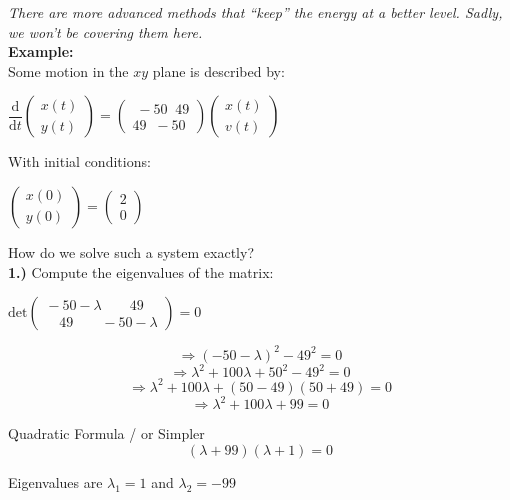 \documentclass[a4paper,12pt]{report}
\begin{document}
	\noindent \textit{There are more advanced methods that ``keep'' the energy at a better level.  Sadly, we won't be covering them here.}\\
	
	\noindent \textbf{Example:}\\
	Some motion in the $xy$ plane is described by:
	\begin{center}
		$\dfrac{\mathrm{d}}{\mathrm{d}t}
  		\begin{pmatrix}
			x(t)\\
			y(t)
		\end{pmatrix}
			=
		\begin{pmatrix}
			\;-50 \; \; 49 \\
			49 \; \;-50
			\end{pmatrix}
		\begin{pmatrix}
			x(t) \\
			v(t)
		\end{pmatrix}
		$
	\end{center}
	With initial conditions:
	\begin{center}
	$
		\begin{pmatrix}
			x(0)\\
			y(0)
		\end{pmatrix}
			=
		\begin{pmatrix}
			2 \\
			0
		\end{pmatrix}
		$
	\end{center}
	
	
	\noindent How do we solve such a system exactly?\\
	
	\noindent \textbf{1.)} Compute the eigenvalues of the matrix:\\
	\begin{center}
	$\text{det}
	\begin{pmatrix}
		\! \! -50 - \lambda \qquad 49 \\
		\quad 49 \qquad -50 - \lambda
	\end{pmatrix}
	= 0
	$
	\end{center}
	$$\Rightarrow (-50 - \lambda)^2 - 49^2 = 0 $$
	$$\Rightarrow \lambda ^2 + 100 \lambda + 50^2 - 49^2 = 0 $$
	$$\Rightarrow \lambda ^ 2 + 100 \lambda + (50-49)(50+49) = 0 $$
	$$\Rightarrow \lambda ^2 + 100 \lambda + 99  = 0$$
	
	\noindent Quadratic Formula / or Simpler
	$$ (\lambda + 99)(\lambda +1) = 0 $$
	
	\noindent Eigenvalues are $\lambda_1 = 1$ and $ \lambda_2 = -99 $\\ \\
	
\end{document}
